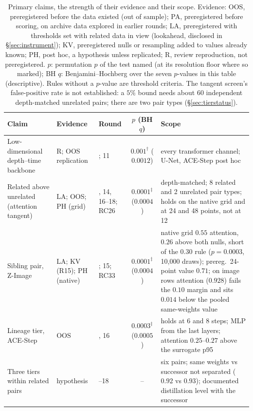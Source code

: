 \documentclass[11pt]{article}
\begin{document}
\begin{table}[p]
\centering\scriptsize
\caption{Primary claims, the strength of their evidence and their scope. Evidence: OOS, preregistered before the data existed (out of sample); PA, preregistered before scoring, on archive data explored in earlier rounds; LA, preregistered with thresholds set with related data in view (lookahead, disclosed in \S\ref{sec:instrument}); KV, preregistered nulls or resampling added to values already known; PH, post hoc, a hypothesis unless replicated; R, review reproduction, not preregistered. $p$: permutation $p$ of the test named (at its resolution floor where so marked); BH $q$: Benjamini--Hochberg over the seven $p$-values in this table (descriptive). Rules without a $p$-value are threshold criteria. The tangent screen's false-positive rate is not established: a $5\%$ bound needs about 60 independent depth-matched unrelated pairs; there are two pair types (\S\ref{sec:tierstatus}).}
\label{tab:primary}
\renewcommand{\arraystretch}{0.82}\setlength\tabcolsep{4pt}\begin{tabularx}{\linewidth}{@{}>{\raggedright\arraybackslash}p{3.2cm}>{\raggedright\arraybackslash}p{1.8cm}>{\raggedright\arraybackslash}p{1.5cm}c>{\raggedright\arraybackslash}X@{}}
\toprule
Claim & Evidence & Round & $p$ (BH $q$) & Scope\\
\midrule
Low-dimensional depth--time backbone & R; OOS replication & 1; 11 & $0.001^{\dagger}$ ($0.0012$) & every transformer channel; U-Net, ACE-Step post hoc\\
Related above unrelated (attention tangent) & LA; OOS; PH (grid) & 12, 14, 16--18; RC26 & $0.0001^{\ddagger}$ ($0.0004$) & depth-matched; 8 related and 2 unrelated pair types; holds on the native grid and at 24 and 48 points, not at 12\\
Sibling pair, Z-Image & LA; KV (R15); PH (native) & 12; 15; RC33 & $0.0001^{\ddagger}$ ($0.0004$) & native grid $0.55$ attention, $0.26$ above both nulls, short of the $0.30$ rule ($p=0.0003$, 10{,}000 draws); prereg.\ 24-point value $0.71$; on image rows attention ($0.928$) fails the $0.10$ margin and sits $0.014$ below the pooled same-weights value\\
Lineage tier, ACE-Step & OOS & 14, 16 & $0.0003^{\ddagger}$ ($0.0005$) & holds at 6 and 8 steps; MLP from the last layers; attention $0.25$--$0.27$ above the surrogate p95\\
Three tiers within related pairs & hypothesis & 12--18 & -- & six pairs; same weights vs successor not separated ($0.92$ vs $0.93$); documented distillation level with the successor\\

\end{tabularx}
\end{table}
\end{document}
